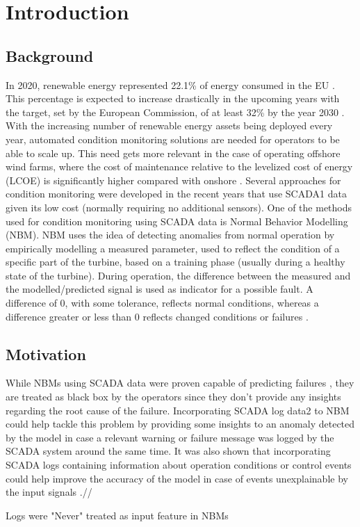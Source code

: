 \chapter{Introduction}
\label{chap:intro}
\minitoc

\section{Background}
In 2020, renewable energy represented 22.1\% of energy consumed in the EU \cite{Renewable_energy_statistics}. This
percentage is expected to increase drastically in the upcoming years with the target, set by
the European Commission, of at least 32\% by the year 2030 \cite{Renewable_energy_targets}. With the increasing number
of renewable energy assets being deployed every year, automated condition monitoring
solutions are needed for operators to be able to scale up. This need gets more relevant in the
case of operating offshore wind farms, where the cost of maintenance relative to the levelized
cost of energy (LCOE) is significantly higher compared with onshore \cite{SCADA_NBM_Review}.
Several approaches for condition monitoring were developed in the recent years that use
SCADA1 data given its low cost (normally requiring no additional sensors).
One of the methods used for condition monitoring using SCADA data is Normal Behavior
Modelling (NBM). NBM uses the idea of detecting anomalies from normal operation by
empirically modelling a measured parameter, used to reflect the condition of a specific part of
the turbine, based on a training phase (usually during a healthy state of the turbine). During
operation, the difference between the measured and the modelled/predicted signal is used as
indicator for a possible fault. A difference of 0, with some tolerance, reflects normal conditions,
whereas a difference greater or less than 0 reflects changed conditions or failures \cite{SCADA_NBM_Review}.

\section{Motivation}
While NBMs using SCADA data were proven capable of predicting failures \cite{SCADA_NBM_Review}, they are
treated as black box by the operators since they don’t provide any insights regarding the root
cause of the failure. Incorporating SCADA log data2 to NBM could help tackle this problem by
providing some insights to an anomaly detected by the model in case a relevant warning or failure message was logged by the SCADA system around the same time.
It was also shown that incorporating SCADA logs containing information about operation
conditions or control events could help improve the accuracy of the model in case of events
unexplainable by the input signals \cite{Letzgus_Log}.//

Logs were "Never" treated as input feature in NBMs


